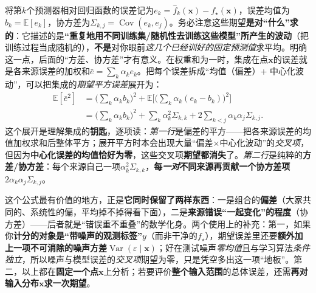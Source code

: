 将第$k$个预测器相对回归函数的误差记为$e_k=\hat f_k(\bm{x})-f_\star(\bm{x})$，误差均值为$b_k=\mathbb{E}[e_k]$，协方差为$\Sigma_{k,j}=\operatorname{Cov}(e_k,e_j)$。务必注意这些期望\textbf{是对“什么”求的}：它描述的是\textbf{“重复地用不同训练集/随机性去训练这些模型”所产生的波动}（把训练过程当成随机的），\textbf{不是}对你眼前\emph{这几个已经训好的固定预测值}求平均。明确这一点，后面的“方差、协方差”才有意义。在权重和为一时，集成在点$\bm{x}$的误差就是各来源误差的加权和$\bar e=\sum_k\alpha_ke_k$。把每个误差拆成“均值（偏差）+ 中心化波动”，可以把集成的\emph{期望平方误差}展开为：
\begin{equation}
  \begin{aligned}
    \mathbb{E}[\bar e^2]
    &=\biggl(\sum_k\alpha_k b_k\biggr)^2+
      \mathbb{E}\biggl[\biggl(\sum_k\alpha_k(e_k-b_k)\biggr)^2\biggr]\\
    &=\biggl(\sum_k\alpha_k b_k\biggr)^2+
      \sum_k\alpha_k^2\Sigma_{k,k}
      +2\sum_{k<j}\alpha_k\alpha_j\Sigma_{k,j}.
  \end{aligned}
  \label{eq:ket-integration-bias-covariance}
\end{equation}
这个展开是理解集成的\textbf{钥匙}，逐项读：\emph{第一行}是偏差的平方——把各来源误差的均值加权求和后整体平方；展开平方时本会出现大量“偏差$\times$中心化波动”的\emph{交叉项}，但因为\textbf{中心化误差的均值恰好为零}，这些交叉项\textbf{期望都消失}了。\emph{第二行}是纯粹的\textbf{方差/协方差}：每个来源自己一项$\alpha_k^2\Sigma_{k,k}$，\textbf{每\emph{一对}不同来源再贡献一个协方差项}$2\alpha_k\alpha_j\Sigma_{k,j}$。

这个公式最有价值的地方，正是\textbf{它同时保留了两样东西}：一是组合的\textbf{偏差}（大家共同的、系统性的偏，平均掉不掉得看下面），二是\textbf{来源错误“一起变化”的程度}（协方差）——后者就是“错误重不重叠”的数学化身。两个使用上的补充：第一，如果你\textbf{计分的对象是“带噪声的观测标签”$y$}（而非干净的$f_\star$），期望误差里还要\textbf{额外加上一项不可消除的噪声方差}$\operatorname{Var}(\varepsilon\mid\bm{x})$；好在测试噪声\emph{零均值}且与学习算法\emph{条件独立}，所以噪声与模型误差的\emph{交叉项}期望为零，只是凭空多出这一项“地板”。第二，以上都在\textbf{固定一个点}$\bm{x}$上分析；若要评价\textbf{整个输入范围}的总体误差，还需\textbf{再对输入分布$\bm{x}$求一次期望}。

